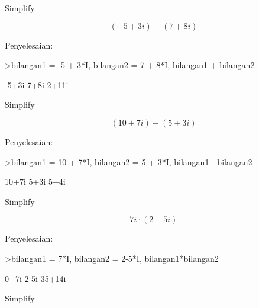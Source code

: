 \documentclass[a4paper,10pt]{article}
\begin{document}
\begin{eulernotebook}
\begin{eulercomment}
\begin{eulercomment}
\begin{eulercomment}
\end{eulercomment}
\begin{eulercomment}
Simplify\\
\end{eulercomment}
\begin{eulerformula}
\[
(-5+3i) + (7+8i)
\]
\end{eulerformula}
\begin{eulercomment}
Penyelesaian:
\end{eulercomment}
\begin{eulerprompt}
>bilangan1 = -5 + 3*I, bilangan2 = 7 + 8*I, bilangan1 + bilangan2
\end{eulerprompt}
\begin{euleroutput}
  -5+3i
  7+8i
  2+11i
\end{euleroutput}
\begin{eulercomment}
Simplify\\
\end{eulercomment}
\begin{eulerformula}
\[
(10+7i)-(5+3i)
\]
\end{eulerformula}
\begin{eulercomment}
Penyelesaian:
\end{eulercomment}
\begin{eulerprompt}
>bilangan1 = 10 + 7*I, bilangan2 = 5 + 3*I, bilangan1 - bilangan2
\end{eulerprompt}
\begin{euleroutput}
  10+7i
  5+3i
  5+4i
\end{euleroutput}
\begin{eulercomment}
Simplify\\
\end{eulercomment}
\begin{eulerformula}
\[
7i\cdot (2-5i)
\]
\end{eulerformula}
\begin{eulercomment}
Penyelesaian:
\end{eulercomment}
\begin{eulerprompt}
>bilangan1 = 7*I, bilangan2 = 2-5*I, bilangan1*bilangan2
\end{eulerprompt}
\begin{euleroutput}
  0+7i
  2-5i
  35+14i
\end{euleroutput}
\begin{eulercomment}
Simplify\\
\end{eulercomment}

\end{eulercomment}
\end{eulercomment}
\end{eulernotebook}
\end{document}
